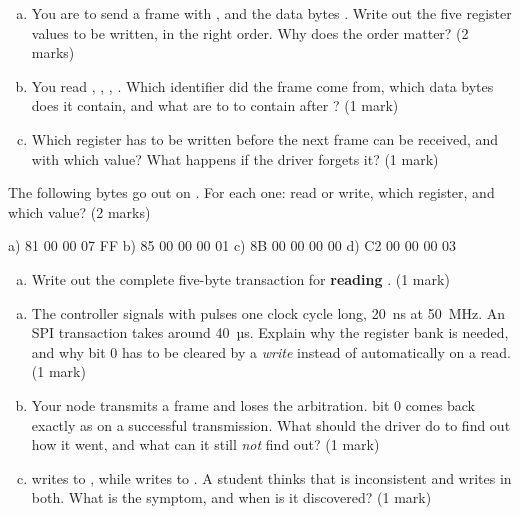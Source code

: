 \label{ex:d:7}
\begin{enumerate}[a)]
  \item You are to send a frame with ,  and the data bytes
    . Write out the five register values to be written, in the right order.
    Why does the order matter? (2 marks)
  \item You read , ,
    , . Which identifier did the frame
    come from, which data bytes does it contain, and what are  to
     to contain after ? (1 mark)
  \item Which register has to be written before the next frame can be received, and with which
    value? What happens if the driver forgets it? (1 mark)
\end{enumerate}

\label{ex:d:8}
The following bytes go out on . For each one: read or write, which register, and which
value? (2 marks)
\begin{console}
a)  81 00 00 07 FF
b)  85 00 00 00 01
c)  8B 00 00 00 00
d)  C2 00 00 00 03
\end{console}
\begin{enumerate}[e)]
  \item Write out the complete five-byte transaction for \textbf{reading} . (1 mark)
\end{enumerate}

\label{ex:d:9}
\begin{enumerate}[a)]
  \item The controller signals with pulses one clock cycle long, 20~ns at 50~MHz. An SPI
    transaction takes around 40~µs. Explain why the register bank is needed, and why 
    bit 0 has to be cleared by a \emph{write} instead of automatically on a read. (1 mark)
  \item Your node transmits a frame and loses the arbitration.  bit 0 comes back
    exactly as on a successful transmission. What should the driver do to find out how it went,
    and what can it still \emph{not} find out? (1 mark)
  \item {} writes  to , while  writes
     to . A student thinks that is inconsistent and writes  in
    both. What is the symptom, and when is it discovered? (1 mark)
\end{enumerate}
